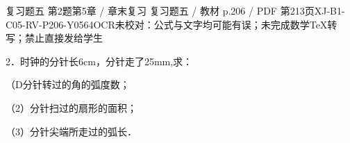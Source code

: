 \begin{bankitem}{复习题五 第2题}{第5章 / 章末复习 复习题五 / 教材 p.206 / PDF 第213页}{XJ-B1-C05-RV-P206-Y0564}{OCR未校对：公式与文字均可能有误；未完成数学TeX转写；禁止直接发给学生}
\begin{ocrdraft}
\par
2．时钟的分针长6cm，分针走了25mm,求：
\par
（D分针转过的角的弧度数；
\par
（2）分针扫过的扇形的面积；
\par
（3）分针尖端所走过的弧长．
\end{ocrdraft}
\end{bankitem}
